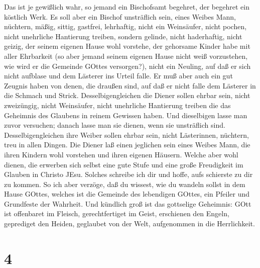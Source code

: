  Das ist je gewißlich wahr, so jemand ein Bischofsamt
begehret, der begehret ein köstlich Werk.  Es soll aber ein
Bischof unsträflich sein, eines Weibes Mann, nüchtern, mäßig, sittig,
gastfrei, lehrhaftig,  nicht ein Weinsäufer, nicht pochen,
nicht unehrliche Hantierung treiben, sondern gelinde, nicht haderhaftig,
nicht geizig,  der seinem eigenen Hause wohl vorstehe, der
gehorsame Kinder habe mit aller Ehrbarkeit  (so aber jemand
seinem eigenen Hause nicht weiß vorzustehen, wie wird er die Gemeinde
GOttes versorgen?),  nicht ein Neuling, auf daß er sich
nicht aufblase und dem Lästerer ins Urteil falle.  Er muß
aber auch ein gut Zeugnis haben von denen, die draußen sind, auf daß er
nicht falle dem Lästerer in die Schmach und Strick. 
Desselbigengleichen die Diener sollen ehrbar sein, nicht zweizüngig,
nicht Weinsäufer, nicht unehrliche Hantierung treiben  die
das Geheimnis des Glaubens in reinem Gewissen haben.  Und
dieselbigen lasse man zuvor versuchen; danach lasse man sie dienen, wenn
sie unsträflich sind.  Desselbigengleichen ihre Weiber
sollen ehrbar sein, nicht Lästerinnen, nüchtern, treu in allen Dingen.
 Die Diener laß einen jeglichen sein eines Weibes Mann, die
ihren Kindern wohl vorstehen und ihren eigenen Häusern. 
Welche aber wohl dienen, die erwerben sich selbst eine gute Stufe und
eine große Freudigkeit im Glauben in Christo JEsu.  Solches
schreibe ich dir und hoffe, aufs schierste zu dir zu kommen.
 So ich aber verzöge, daß du wissest, wie du wandeln sollst
in dem Hause GOttes, welches ist die Gemeinde des lebendigen GOttes, ein
Pfeiler und Grundfeste der Wahrheit.  Und kündlich groß ist
das gottselige Geheimnis: GOtt ist offenbaret im Fleisch,
gerechtfertiget im Geist, erschienen den Engeln, geprediget den Heiden,
geglaubet von der Welt, aufgenommen in die Herrlichkeit.

\hypertarget{section-3}{%
\section{4}\label{section-3}}


